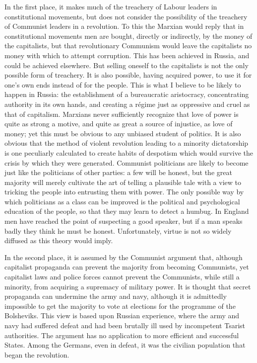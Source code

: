 In the first place, it makes much of the treachery of Labour leaders in constitutional movements, but does not consider the possibility of the treachery of Communist leaders in a revolution. To this the Marxian would reply that in constitutional movements men are bought, directly or indirectly, by the money of the capitalists, but that revolutionary Communism would leave the capitalists no money with which to attempt corruption. This has been achieved in Russia, and could be achieved elsewhere. But selling oneself to the capitalists is not the only possible form of treachery. It is also possible, having acquired power, to use it for one's own ends instead of for the people. This is what I believe to be likely to happen in Russia: the establishment of a bureaucratic aristocracy, concentrating authority in its own hands, and creating a régime just as oppressive and cruel as that of capitalism. Marxians never sufficiently recognize that love of power is quite as strong a motive, and quite as great a source of injustice, as love of money; yet this must be obvious to any unbiased student of politics. It is also obvious that the method of violent revolution leading to a minority dictatorship is one peculiarly calculated to create habits of despotism which would survive the crisis by which they were generated. Communist politicians are likely to become just like the politicians of other parties: a few will be honest, but the great majority will merely cultivate the art of telling a plausible tale with a view to tricking the people into entrusting them with power. The only possible way by which politicians as a class can be improved is the political and psychological education of the people, so that they may learn to detect a humbug. In England men have reached the point of suspecting a good speaker, but if a man speaks badly they think he must be honest. Unfortunately, virtue is not so widely diffused as this theory would imply.

In the second place, it is assumed by the Communist argument that, although capitalist propaganda can prevent the majority from becoming Communists, yet capitalist laws and police forces cannot prevent the Communists, while still a minority, from acquiring a supremacy of military power. It is thought that secret propaganda can undermine the army and navy, although it is admittedly impossible to get the majority to vote at elections for the programme of the Bolsheviks. This view is based upon Russian experience, where the army and navy had suffered defeat and had been brutally ill used by incompetent Tsarist authorities. The argument has no application to more efficient and successful States. Among the Germans, even in defeat, it was the civilian population that began the revolution.

